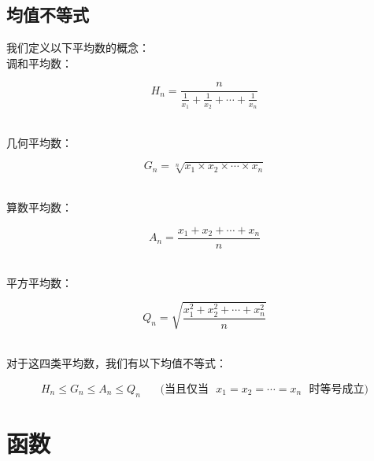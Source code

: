 \documentclass[UTF8]{ctexart}
\begin{document}
\newpage

\subsection{均值不等式}
    我们定义以下平均数的概念：\\[3mm]
    调和平均数：
    \begin{large}
        \begin{equation*}
            H_n=\frac{n}{\frac{1}{x_1}+\frac{1}{x_2}+\cdots+\frac{1}{x_n}}
        \end{equation*}
    \end{large}\\
    几何平均数：
    \begin{large}
        \begin{equation*}
            G_n=\sqrt[n]{x_1\times x_2\times \cdots \times x_n}
        \end{equation*}
    \end{large}\\
    算数平均数：
    \begin{large}
        \begin{equation*}
            A_n=\frac{x_1+x_2+\cdots+x_n}{n}
        \end{equation*}
    \end{large}\\
    平方平均数：
    \begin{large}
        \begin{equation*}
            Q_n=\sqrt{\frac{x_1^2+x_2^2+\cdots+x_n^2}{n}}
        \end{equation*}
    \end{large}\\[2mm]
    对于这四类平均数，我们有以下均值不等式：
    \begin{large}
        \begin{equation*}
            H_n\le G_n\le A_n\le Q_n~~~~~~~~\text{(当且仅当~~}x_1=x_2=\cdots=x_n\text{~~时等号成立)}
        \end{equation*}
    \end{large}

\newpage

\section{函数}
\end{document}
